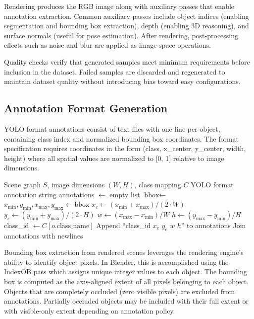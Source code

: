 Rendering produces the RGB image along with auxiliary passes that enable annotation extraction. Common auxiliary passes include object indices (enabling segmentation and bounding box extraction), depth (enabling 3D reasoning), and surface normals (useful for pose estimation). After rendering, post-processing effects such as noise and blur are applied as image-space operations.

Quality checks verify that generated samples meet minimum requirements before inclusion in the dataset. Failed samples are discarded and regenerated to maintain dataset quality without introducing bias toward easy configurations.

\subsection{Annotation Format Generation}

YOLO format annotations consist of text files with one line per object, containing class index and normalized bounding box coordinates. The format specification requires coordinates in the form (class, x\_center, y\_center, width, height) where all spatial values are normalized to [0, 1] relative to image dimensions.

\begin{algorithm}
\caption{YOLO Annotation Extraction}
\label{alg:yolo_annotation}
\begin{algorithmic}[1]
\Require Scene graph $S$, image dimensions $(W, H)$, class mapping $C$
\Ensure YOLO format annotation string
\State annotations $\gets$ empty list
    \State $\text{bbox} \gets$  
    \State $x_{\min}, y_{\min}, x_{\max}, y_{\max} \gets \text{bbox}$
    \State $x_c \gets (x_{\min} + x_{\max}) / (2 \cdot W)$ 
    \State $y_c \gets (y_{\min} + y_{\max}) / (2 \cdot H)$
    \State $w \gets (x_{\max} - x_{\min}) / W$
    \State $h \gets (y_{\max} - y_{\min}) / H$
    \State class\_id $\gets C[o.\text{class\_name}]$
    \State Append ``class\_id $x_c$ $y_c$ $w$ $h$'' to annotations
\EndFor
\State \Return Join annotations with newlines
\end{algorithmic}
\end{algorithm}

Bounding box extraction from rendered scenes leverages the rendering engine's ability to identify object pixels. In Blender, this is accomplished using the IndexOB pass which assigns unique integer values to each object. The bounding box is computed as the axis-aligned extent of all pixels belonging to each object. Objects that are completely occluded (zero visible pixels) are excluded from annotations. Partially occluded objects may be included with their full extent or with visible-only extent depending on annotation policy.


